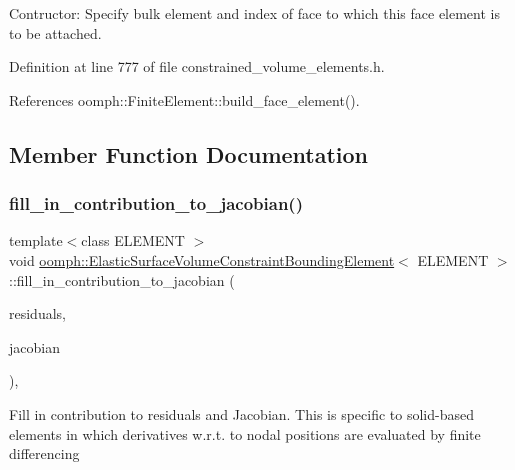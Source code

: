 Contructor\+: Specify bulk element and index of face to which this face element is to be attached. 



Definition at line 777 of file constrained\+\_\+volume\+\_\+elements.\+h.



References oomph\+::\+Finite\+Element\+::build\+\_\+face\+\_\+element().



\subsection{Member Function Documentation}
\mbox{\label{classoomph_1_1ElasticSurfaceVolumeConstraintBoundingElement_a16addc228d9871f22cd9eaf9b581ff5c}} 
\subsubsection{\texorpdfstring{fill\+\_\+in\+\_\+contribution\+\_\+to\+\_\+jacobian()}{fill\_in\_contribution\_to\_jacobian()}}
{\footnotesize\ttfamily template$<$class E\+L\+E\+M\+E\+NT $>$ \\
void \hyperlink{classoomph_1_1ElasticSurfaceVolumeConstraintBoundingElement}{oomph\+::\+Elastic\+Surface\+Volume\+Constraint\+Bounding\+Element}$<$ E\+L\+E\+M\+E\+NT $>$\+::fill\+\_\+in\+\_\+contribution\+\_\+to\+\_\+jacobian (\begin{DoxyParamCaption}\item[{\hyperlink{classoomph_1_1Vector}{Vector}$<$ double $>$ \&}]{residuals,  }\item[{\hyperlink{classoomph_1_1DenseMatrix}{Dense\+Matrix}$<$ double $>$ \&}]{jacobian }\end{DoxyParamCaption})\hspace{0.3cm}{\ttfamily [inline]}, {\ttfamily [virtual]}}

Fill in contribution to residuals and Jacobian. This is specific to solid-\/based elements in which derivatives w.\+r.\+t. to nodal positions are evaluated by finite differencing 

